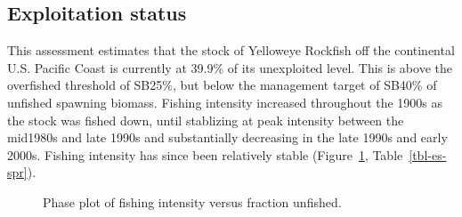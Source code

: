 \documentclass[
]{scrartcl}
\begin{document}
\subsection*{Exploitation status}\label{exploitation-status}

This assessment estimates that the stock of Yelloweye Rockfish off the
continental U.S. Pacific Coast is currently at 39.9\% of its unexploited
level. This is above the overfished threshold of SB25\%, but below the
management target of SB40\% of unfished spawning biomass. Fishing
intensity increased throughout the 1900s as the stock was fished down,
until stablizing at peak intensity between the mid1980s and late 1990s
and substantially decreasing in the late 1990s and early 2000s. Fishing
intensity has since been relatively stable (Figure~\ref{fig-es-kobe},
Table~\ref{tbl-es-spr}).

\begin{figure}[H]


\caption{\label{fig-es-kobe}Phase plot of fishing intensity versus
fraction unfished.}

\end{figure}%
\end{document}
